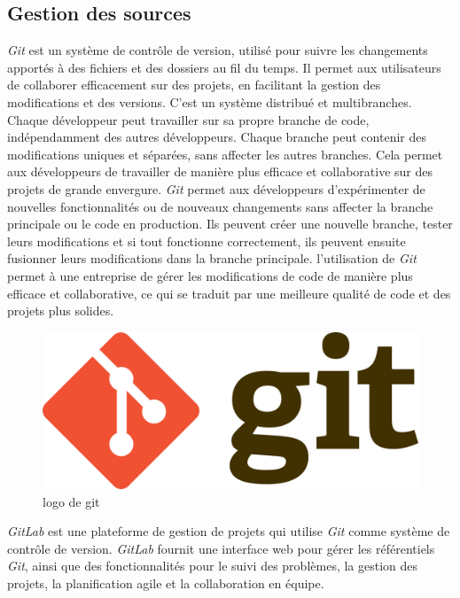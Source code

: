 \documentclass{report}
\begin{document}
\subsection{Gestion des sources}
\textit{Git} \cite{AboutGit} est un système de contrôle de version, utilisé pour suivre les changements apportés à des fichiers et des dossiers au fil du temps. Il permet aux utilisateurs de collaborer efficacement sur des projets, en facilitant la gestion des modifications et des versions. 
C'est un système distribué et multibranches. Chaque développeur peut travailler sur sa propre branche de code, indépendamment des autres développeurs. Chaque branche peut contenir des modifications uniques et séparées, sans affecter les autres branches. Cela permet aux développeurs de travailler de manière plus efficace et collaborative sur des projets de grande envergure. 
\textit{Git} permet aux développeurs d'expérimenter de nouvelles fonctionnalités ou de nouveaux changements sans affecter la branche principale ou le code en production. Ils peuvent créer une nouvelle branche, tester leurs modifications et si tout fonctionne correctement, ils peuvent ensuite fusionner leurs modifications dans la branche principale. l'utilisation de \textit{Git} permet à une entreprise de gérer les modifications de code de manière plus efficace et collaborative, ce qui se traduit par une meilleure qualité de code et des projets plus solides.
\begin{figure}
    \centering
    \includegraphics[scale=0.08]{images/1280px-Git-logo.svg.png}
    \caption{logo de git}
    \label{fig:git}
\end{figure}

\textit{GitLab} est une plateforme de gestion de projets qui utilise \textit{Git} comme système de contrôle de version. \textit{GitLab} fournit une interface web pour gérer les référentiels \textit{Git}, ainsi que des fonctionnalités pour le suivi des problèmes, la gestion des projets, la planification agile et la collaboration en équipe.
\end{document}
